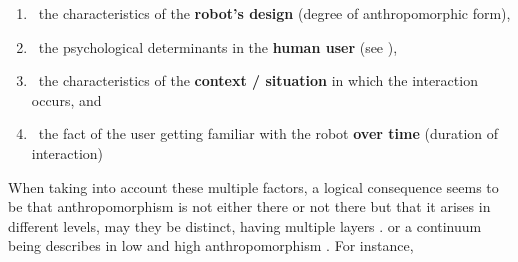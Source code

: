 \documentclass{frontiersSCNS} %
\begin{document}
\begin{enumerate}
\item ~the characteristics of the \textbf{robot's design} (degree of anthropomorphic form),
\item ~the psychological determinants in the \textbf{human user} (see
\cite{epley_seeing_2007}),
\item ~the characteristics of the \textbf{context / situation} in which the interaction occurs, and
\item ~the fact of the user getting familiar with the robot \textbf{over time} (duration of interaction)
\end{enumerate}



%

When taking into account these multiple factors, a logical consequence seems to be that anthropomorphism is not either there or not there but that it arises in different levels, may they be distinct, having multiple layers \citep{persson_anthropomorphism_2000}. or a continuum being describes in low and high anthropomorphism \citep{ruijten_introducing_2014}. For instance, 
\end{document}
